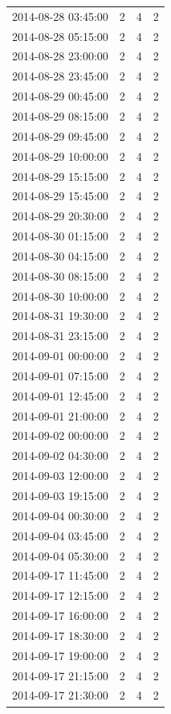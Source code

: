 \begin{tabular}{lrrr}
2014-08-28 03:45:00 & 2 & 4 & 2 \\
2014-08-28 05:15:00 & 2 & 4 & 2 \\
2014-08-28 23:00:00 & 2 & 4 & 2 \\
2014-08-28 23:45:00 & 2 & 4 & 2 \\
2014-08-29 00:45:00 & 2 & 4 & 2 \\
2014-08-29 08:15:00 & 2 & 4 & 2 \\
2014-08-29 09:45:00 & 2 & 4 & 2 \\
2014-08-29 10:00:00 & 2 & 4 & 2 \\
2014-08-29 15:15:00 & 2 & 4 & 2 \\
2014-08-29 15:45:00 & 2 & 4 & 2 \\
2014-08-29 20:30:00 & 2 & 4 & 2 \\
2014-08-30 01:15:00 & 2 & 4 & 2 \\
2014-08-30 04:15:00 & 2 & 4 & 2 \\
2014-08-30 08:15:00 & 2 & 4 & 2 \\
2014-08-30 10:00:00 & 2 & 4 & 2 \\
2014-08-31 19:30:00 & 2 & 4 & 2 \\
2014-08-31 23:15:00 & 2 & 4 & 2 \\
2014-09-01 00:00:00 & 2 & 4 & 2 \\
2014-09-01 07:15:00 & 2 & 4 & 2 \\
2014-09-01 12:45:00 & 2 & 4 & 2 \\
2014-09-01 21:00:00 & 2 & 4 & 2 \\
2014-09-02 00:00:00 & 2 & 4 & 2 \\
2014-09-02 04:30:00 & 2 & 4 & 2 \\
2014-09-03 12:00:00 & 2 & 4 & 2 \\
2014-09-03 19:15:00 & 2 & 4 & 2 \\
2014-09-04 00:30:00 & 2 & 4 & 2 \\
2014-09-04 03:45:00 & 2 & 4 & 2 \\
2014-09-04 05:30:00 & 2 & 4 & 2 \\
2014-09-17 11:45:00 & 2 & 4 & 2 \\
2014-09-17 12:15:00 & 2 & 4 & 2 \\
2014-09-17 16:00:00 & 2 & 4 & 2 \\
2014-09-17 18:30:00 & 2 & 4 & 2 \\
2014-09-17 19:00:00 & 2 & 4 & 2 \\
2014-09-17 21:15:00 & 2 & 4 & 2 \\
2014-09-17 21:30:00 & 2 & 4 & 2 \\

\end{tabular}

